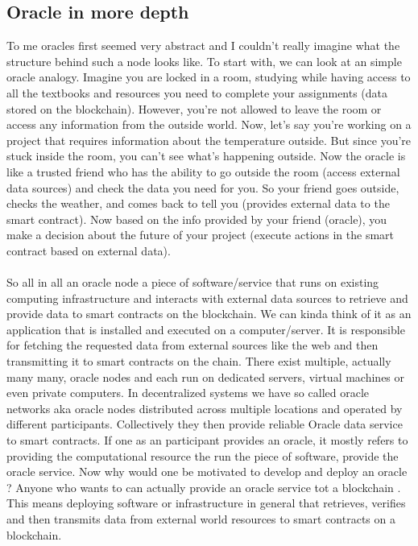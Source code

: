 \documentclass{article}
\begin{document}
\subsection{Oracle in more depth}
To me oracles first seemed very abstract and I couldn't really imagine what the structure behind such a node looks like. To start with, we can look at an simple oracle analogy. Imagine you are locked in a room, studying while having access to all the textbooks and resources you need to complete your assignments (data stored on the blockchain). However, you're not allowed to leave the room or access any information from the outside world. Now, let's say you're working on a project that requires information about the temperature outside. But since you're stuck inside the room, you can't see what's happening outside. Now the oracle is like a trusted friend who has the ability to go outside the room (access external data sources) and check the data you need for you. So your friend goes outside, checks the weather, and comes back to tell you (provides external data to the smart contract). Now based on the info provided by your friend (oracle), you make a decision about the future of your project (execute actions in the smart contract based on external data).
\\
\\
So all in all an oracle node a piece of software/service that runs on existing computing infrastructure and interacts with external data sources to retrieve and provide data to smart contracts on the blockchain. We can kinda think of it as an application that is installed and executed on a computer/server. It is responsible for fetching the requested data from external sources like the web and then transmitting it to smart contracts on the chain. There exist multiple, actually many many, oracle nodes and each run on dedicated servers, virtual machines or even private computers. In decentralized systems we have so called oracle networks aka oracle nodes distributed across multiple locations and operated by different participants. Collectively they then provide reliable Oracle data service to smart contracts. If one as an participant provides an oracle, it mostly refers to providing the computational resource the run the piece of software, provide the oracle service. Now why would one be motivated to develop and deploy an oracle ? Anyone who wants to can actually provide an oracle service tot  a blockchain . This means deploying software or infrastructure in general that retrieves, verifies and then transmits data from external world resources to smart contracts on a blockchain. 
\end{document}
